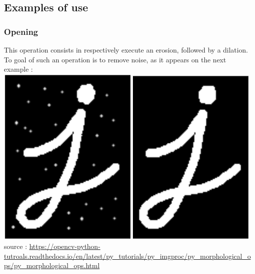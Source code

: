 \documentclass{article}
\begin{document}
\subsection{Examples of use}

\subsubsection{Opening}

This operation consists in respectively execute an erosion, followed by a dilation. To goal of such an operation is to remove noise, as it appears on the next example :\\

\includegraphics[width=6.8cm]{images/img15.png} 
\includegraphics[width=6.3cm]{images/img16.png}\\
source : \url{https://opencv-python-tutroals.readthedocs.io/en/latest/py_tutorials/py_imgproc/py_morphological_ops/py_morphological_ops.html}\\
\end{document}

